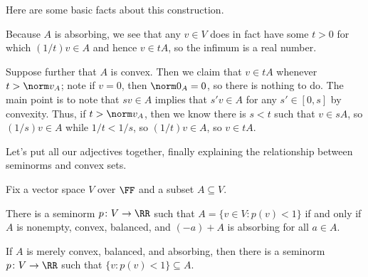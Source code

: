 \documentclass[notes.tex]{subfiles}
\begin{document}
Here are some basic facts about this construction.
\begin{remark} \label{rem:mink-seminorm-defined}
	Because $A$ is absorbing, we see that any $v\in V$ does in fact have some $t>0$ for which $(1/t)v\in A$ and hence $v\in tA$, so the infimum is a real number.
\end{remark}
\begin{remark} \label{rem:better-mink-seminorm}
	Suppose further that $A$ is convex. Then we claim that $v\in tA$ whenever $t>\norm v_A$; note if $v=0$, then $\norm 0_A=0$, so there is nothing to do. The main point is to note that $sv\in A$ implies that $s'v\in A$ for any $s'\in[0,s]$ by convexity. Thus, if $t>\norm v_A$, then we know there is $s<t$ such that $v\in sA$, so $(1/s)v\in A$ while $1/t<1/s$, so $(1/t)v\in A$, so $v\in tA$.
\end{remark}
Let's put all our adjectives together, finally explaining the relationship between seminorms and convex sets.
\begin{proposition} \label{prop:convex-to-seminorm}
	Fix a vector space $V$ over $\FF$ and a subset $A\subseteq V$.
	\begin{listalph}
		\item There is a seminorm $p\colon V\to\RR$ such that $A=\{v\in V:p(v)<1\}$ if and only if $A$ is nonempty, convex, balanced, and $(-a)+A$ is absorbing for all $a\in A$.
		\item If $A$ is merely convex, balanced, and absorbing, then there is a seminorm $p\colon V\to\RR$ such that $\{v:p(v)<1\}\subseteq A$.
	\end{listalph}
\end{proposition}
\end{document}

